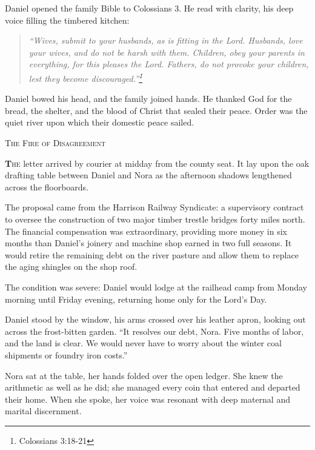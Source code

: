 \documentclass[11pt]{article}
\begin{document}
Daniel opened the family Bible to Colossians 3. He read with clarity, his deep voice filling the timbered kitchen:
\begin{quote}
\textit{``Wives, submit to your husbands, as is fitting in the Lord. Husbands, love your wives, and do not be harsh with them. Children, obey your parents in everything, for this pleases the Lord. Fathers, do not provoke your children, lest they become discouraged.''\footnote{Colossians 3:18-21}}
\end{quote}
Daniel bowed his head, and the family joined hands. He thanked God for the bread, the shelter, and the blood of Christ that sealed their peace. Order was the quiet river upon which their domestic peace sailed.

\newpage

\begin{center}
    {\scshape\large The Fire of Disagreement}\par
    \vspace{0.2in}
\end{center}

\lettrine[lines=3,findent=1pt,nindent=0pt]{\textbf{T}}{he} letter arrived by courier at midday from the county seat. It lay upon the oak drafting table between Daniel and Nora as the afternoon shadows lengthened across the floorboards.

The proposal came from the Harrison Railway Syndicate: a supervisory contract to oversee the construction of two major timber trestle bridges forty miles north. The financial compensation was extraordinary, providing more money in six months than Daniel's joinery and machine shop earned in two full seasons. It would retire the remaining debt on the river pasture and allow them to replace the aging shingles on the shop roof.

The condition was severe: Daniel would lodge at the railhead camp from Monday morning until Friday evening, returning home only for the Lord's Day.

Daniel stood by the window, his arms crossed over his leather apron, looking out across the frost-bitten garden. ``It resolves our debt, Nora. Five months of labor, and the land is clear. We would never have to worry about the winter coal shipments or foundry iron costs.''

Nora sat at the table, her hands folded over the open ledger. She knew the arithmetic as well as he did; she managed every coin that entered and departed their home. When she spoke, her voice was resonant with deep maternal and marital discernment.
\end{document}
